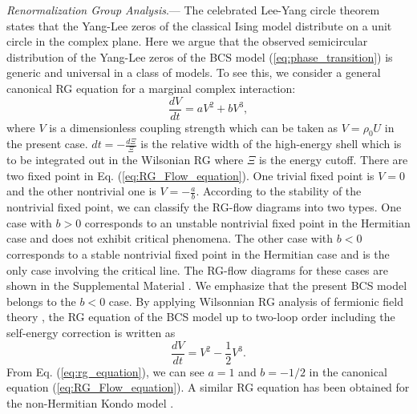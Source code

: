 \documentclass[aps,prl,twocolumn,nofootinbib,superscriptaddress,notitlepage,longbibliography]{revtex4-1}
\begin{document}
	\emph{Renormalization Group Analysis}.--- %
	The celebrated Lee-Yang circle theorem \cite{PhysRev.87.410} states that the Yang-Lee zeros of the classical Ising model distribute on a unit circle in the complex plane. Here we argue that the observed semicircular distribution of the Yang-Lee zeros of the BCS model (\ref{eq:phase_transition}) is generic and universal in a class of models. To see this, we consider a general canonical RG equation for a marginal complex interaction: 
	\begin{equation}
		\frac{dV}{dt}=aV^{2}+bV^{3},\label{eq:RG_Flow_equation}
	\end{equation}
	where $V$ is a dimensionless coupling strength which can be taken as $V=\rho_0U$ in the present case. $dt=-\frac{d\Xi}{\Xi}$ is the relative width of the high-energy shell which is to be integrated out in the Wilsonian RG where $\Xi$ is the energy cutoff. There are two fixed point in Eq. (\ref{eq:RG_Flow_equation}). One trivial fixed point is $V=0$ and the other nontrivial one is $V=-\frac{a}{b}$. According to the stability of the nontrivial fixed point, we can classify the RG-flow diagrams into two types. %
	One case with $b>0$ corresponds to an unstable nontrivial fixed point in the Hermitian case and does not exhibit critical phenomena. The other case with $b<0$ corresponds to a stable nontrivial fixed point in the Hermitian case and is the only case involving the critical line. The RG-flow diagrams for these cases are shown in the Supplemental Material \cite{SupplementaryMaterial}. We emphasize that the present BCS model belongs to the $b<0$ case. By applying Wilsonnian RG analysis of fermionic field theory \cite{Shankar1994}, the RG equation of the BCS model up to two-loop order including the self-energy correction is written as \cite{SupplementaryMaterial}
	\begin{equation}
		\frac{dV}{dt}=V^{2}-\frac{1}{2}V^{3}.\label{eq:rg_equation}
	\end{equation} 
	 From Eq. (\ref{eq:rg_equation}), we can see $a=1$ and $b=-1/2$ in the canonical equation (\ref{eq:RG_Flow_equation}). A similar RG equation has been obtained for the non-Hermitian Kondo model \cite{Nakagawa2018}. %
\end{document}
